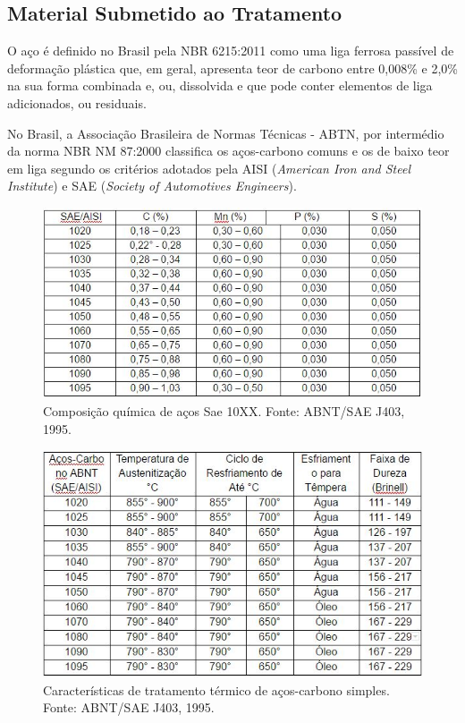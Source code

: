 \subsection{Material Submetido ao Tratamento}

O aço é definido no Brasil pela NBR 6215:2011 como uma liga ferrosa passível de deformação plástica que, em geral, apresenta teor de carbono entre 0,008\% e 2,0\% na sua forma combinada e, ou, dissolvida e que pode conter elementos de liga adicionados, ou residuais.

No Brasil, a Associação Brasileira de Normas Técnicas - ABTN, por intermédio da norma NBR NM 87:2000 classifica os aços-carbono comuns e os de baixo teor em liga segundo os critérios adotados pela AISI (\textit{American Iron and Steel Institute}) e SAE (\textit{Society of Automotives Engineers}).

\begin{figure}[!h]
	\centering
	\label{tab_sae1}
	\includegraphics[keepaspectratio=true,scale=0.8]{figuras/tab_sae1.JPG}
	\caption{Composição química de aços Sae 10XX. Fonte: ABNT/SAE J403, 1995.}
\end{figure}

\begin{figure}[!h]
	\centering
	\label{tab_sae2}
	\includegraphics[keepaspectratio=true,scale=0.8]{figuras/tab_sae2.JPG}
	\caption{Características de tratamento térmico de aços-carbono simples.  Fonte: ABNT/SAE J403, 1995.}
\end{figure}

